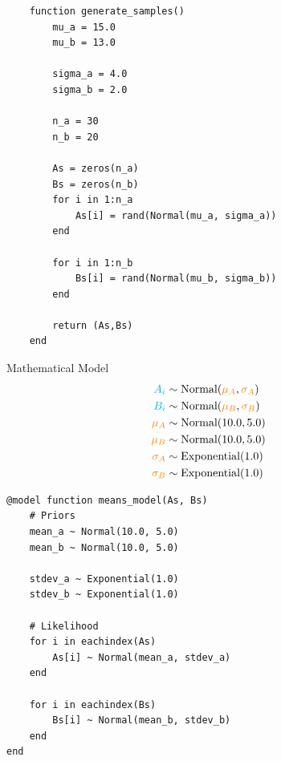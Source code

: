 \documentclass[aspectratio=169,xcolor=svgnames]{beamer}
\begin{document}
\newcommand{\parameter}[1]{\textcolor{orange}{#1}}
\newcommand{\observed}[1]{\textcolor{cyan}{#1}}

\newcommand{\normal}[1]{\text{Normal}(#1)}
\newcommand{\exponential}[1]{\text{Exponential}(#1)}

\begin{frame}[fragile]
    \begin{verbatim}
    function generate_samples()
        mu_a = 15.0
        mu_b = 13.0

        sigma_a = 4.0
        sigma_b = 2.0

        n_a = 30
        n_b = 20

        As = zeros(n_a)
        Bs = zeros(n_b)
        for i in 1:n_a
            As[i] = rand(Normal(mu_a, sigma_a))
        end

        for i in 1:n_b
            Bs[i] = rand(Normal(mu_b, sigma_b))
        end

        return (As,Bs)
    end
    \end{verbatim}
\end{frame}

\begin{frame}{Mathematical Model}
  \begin{align*}
    \observed{A_i} &\sim \normal{\parameter{\mu_A}, \parameter{\sigma_A}}\\
    \observed{B_i} &\sim \normal{\parameter{\mu_B}, \parameter{\sigma_B}}\\
    \parameter{\mu_A} &\sim \normal{10.0, 5.0}\\
    \parameter{\mu_B} &\sim \normal{10.0, 5.0}\\
    \parameter{\sigma_A} &\sim \exponential{1.0}\\
    \parameter{\sigma_B} &\sim \exponential{1.0}\\
  \end{align*}
\end{frame}

\begin{frame}[fragile]
  \begin{verbatim}
@model function means_model(As, Bs)
    # Priors
    mean_a ~ Normal(10.0, 5.0)
    mean_b ~ Normal(10.0, 5.0)

    stdev_a ~ Exponential(1.0)
    stdev_b ~ Exponential(1.0)

    # Likelihood
    for i in eachindex(As)
        As[i] ~ Normal(mean_a, stdev_a)
    end

    for i in eachindex(Bs)
        Bs[i] ~ Normal(mean_b, stdev_b)
    end
end
  \end{verbatim}
\end{frame}
\end{document}
